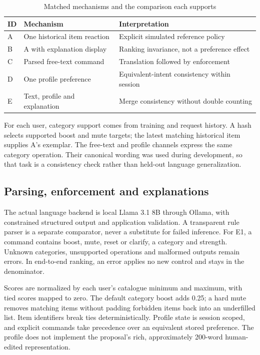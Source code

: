 \documentclass[conference]{IEEEtran}
\begin{document}
\begin{table}[t]\centering\small
\caption{Matched mechanisms and the comparison each supports}
\begin{tabular}{p{0.4cm}p{2.6cm}p{3.9cm}}\toprule
ID&Mechanism&Interpretation\\\midrule
A&One historical item reaction&Explicit simulated reference policy\\
B&A with explanation display&Ranking invariance, not a preference effect\\
C&Parsed free-text command&Translation followed by enforcement\\
D&One profile preference&Equivalent-intent consistency within session\\
E&Text, profile and explanation&Merge consistency without double counting\\\bottomrule
\end{tabular}\end{table}

For each user, category support comes from training and request history. A hash selects supported boost and mute targets; the latest matching historical item supplies A's exemplar. The free-text and profile channels express the same category operation. Their canonical wording was used during development, so that task is a consistency check rather than held-out language generalization.

\subsection{Parsing, enforcement and explanations}
The actual language backend is local Llama 3.1 8B through Ollama, with constrained structured output and application validation. A transparent rule parser is a separate comparator, never a substitute for failed inference. For E1, a command contains boost, mute, reset or clarify, a category and strength. Unknown categories, unsupported operations and malformed outputs remain errors. In end-to-end ranking, an error applies no new control and stays in the denominator.

Scores are normalized by each user's catalogue minimum and maximum, with tied scores mapped to zero. The default category boost adds 0.25; a hard mute removes matching items without padding forbidden items back into an underfilled list. Item identifiers break ties deterministically. Profile state is session scoped, and explicit commands take precedence over an equivalent stored preference. The profile does not implement the proposal's rich, approximately 200-word human-edited representation.
\end{document}
